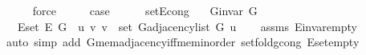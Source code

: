 \begin{isabellebody}
\ \ \ \ \isamarkupfalse%
\ force\isanewline
\ \ \isamarkupfalse%
\ \isamarkupfalse%
\ {\isacharquery}{\kern0pt}case\isanewline
\ \ \ \ \isacommand{{\isachardot}{\kern0pt}}\isamarkupfalse%
\isanewline
{}\isamarkupfalse%
%
\endisatagproof
{\isafoldproof}%
%
\isadelimproof
\isanewline
%
\endisadelimproof
\isanewline
{}\isamarkupfalse%
\ set{\isacharunderscore}{\kern0pt}E{\isacharunderscore}{\kern0pt}cong{\isacharcolon}{\kern0pt}\isanewline
\ \ \ {\isachardoublequoteopen}G{\isachardot}{\kern0pt}invar\ G{\isachardoublequoteclose}\isanewline
\ \ \ {\isachardoublequoteopen}E{\isachardot}{\kern0pt}set\ {\isacharparenleft}{\kern0pt}E\ G{\isacharparenright}{\kern0pt}\ {\isacharequal}{\kern0pt}\ {\isacharbraceleft}{\kern0pt}{\isacharparenleft}{\kern0pt}u{\isacharcomma}{\kern0pt}\ v{\isacharparenright}{\kern0pt}{\isachardot}{\kern0pt}\ v\ {\isasymin}\ set\ {\isacharparenleft}{\kern0pt}G{\isachardot}{\kern0pt}adjacency{\isacharunderscore}{\kern0pt}list\ G\ u{\isacharparenright}{\kern0pt}{\isacharbraceright}{\kern0pt}{\isachardoublequoteclose}\isanewline
%
\isadelimproof
\ \ %
\endisadelimproof
%
\isatagproof
{}\isamarkupfalse%
\ assms\ E{\isachardot}{\kern0pt}invar{\isacharunderscore}{\kern0pt}empty\isanewline
\ \ \isamarkupfalse%
\ {\isacharparenleft}{\kern0pt}auto\ simp\ add{\isacharcolon}{\kern0pt}\ G{\isachardot}{\kern0pt}mem{\isacharunderscore}{\kern0pt}adjacency{\isacharunderscore}{\kern0pt}iff{\isacharunderscore}{\kern0pt}mem{\isacharunderscore}{\kern0pt}inorder\ set{\isacharunderscore}{\kern0pt}fold{\isacharunderscore}{\kern0pt}g{\isacharunderscore}{\kern0pt}cong\ E{\isachardot}{\kern0pt}set{\isacharunderscore}{\kern0pt}empty{\isacharparenright}{\kern0pt}%
\endisatagproof
{\isafoldproof}%
%
\isadelimproof
\isanewline
%
\endisadelimproof
%
\isadeliminvisible
\isanewline
%
\endisadeliminvisible
%
\isataginvisible
{}\isamarkupfalse%
%
\endisataginvisible
{\isafoldinvisible}%
%
\isadeliminvisible
\isanewline
%
\endisadeliminvisible
%
\isadelimtheory
\isanewline
%
\endisadelimtheory
%
\isatagtheory
{}\isamarkupfalse%
%
\endisatagtheory
{\isafoldtheory}%
%
\isadelimtheory
%
\endisadelimtheory
%
\end{isabellebody}%
\endinput

